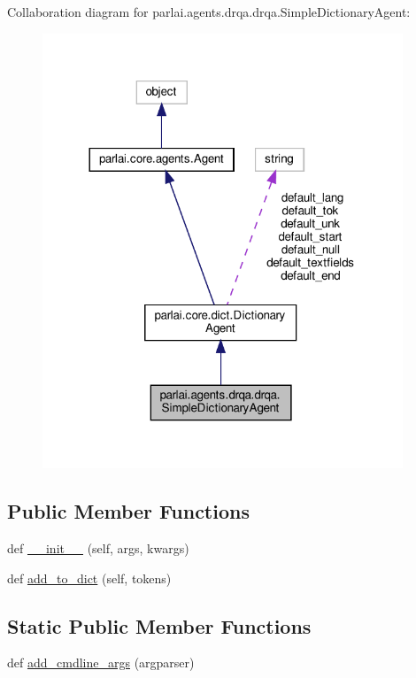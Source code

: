Collaboration diagram for parlai.\+agents.\+drqa.\+drqa.\+Simple\+Dictionary\+Agent\+:
\nopagebreak
\begin{figure}[H]
\begin{center}
\leavevmode
\includegraphics[width=305pt]{d0/df5/classparlai_1_1agents_1_1drqa_1_1drqa_1_1SimpleDictionaryAgent__coll__graph}
\end{center}
\end{figure}
\subsection*{Public Member Functions}
\begin{DoxyCompactItemize}
\item 
def \hyperlink{classparlai_1_1agents_1_1drqa_1_1drqa_1_1SimpleDictionaryAgent_ae21eeff2d5a918998ca8ea90279c9b07}{\+\_\+\+\_\+init\+\_\+\+\_\+} (self, args, kwargs)
\item 
def \hyperlink{classparlai_1_1agents_1_1drqa_1_1drqa_1_1SimpleDictionaryAgent_a5ccaf2bd28a50af2062ad2efd6a36e0e}{add\+\_\+to\+\_\+dict} (self, tokens)
\end{DoxyCompactItemize}
\subsection*{Static Public Member Functions}
\begin{DoxyCompactItemize}
\item 
def \hyperlink{classparlai_1_1agents_1_1drqa_1_1drqa_1_1SimpleDictionaryAgent_a43e40daa2e8260d919347a8e40ae3ced}{add\+\_\+cmdline\+\_\+args} (argparser)
\end{DoxyCompactItemize}
